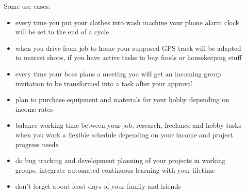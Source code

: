 \medskip\noindent
Some use cases:
\begin{itemize}[nosep]
  \item every time you put your clothes into wash machine your phone alarm clock
  will be set to the end of a cycle
  \item when you drive from job to home your supposed GPS track will be adapted
  to nearest shops, if you have active tasks to buy foods or housekeeping stuff
  \item every time your boss plans a meeting you will get an incoming group
  invitation to be transformed into a task after your approval
  \item plan to purchase equipment and materials for your hobby depending on
  income rates
  \item balance working time between your job, research, freelance and hobby
  tasks when you work a flexible schedule depending on your income and project
  progress needs
  \item do bug tracking and development planning of your projects in working
  groups, integrate automated continuous learning with your lifetime 
  \item don't forget about feast-days of your family and friends
\end{itemize}